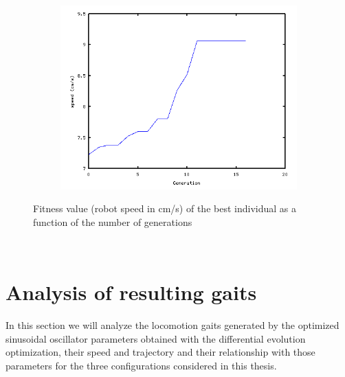 \begin{figure}[h]
\begin{subfigure}[b]{0.31\textwidth}
                \label{fig:results_fitness_plot_9}
        \end{subfigure}
        ~
        \begin{subfigure}[b]{0.315\textwidth}
         	   \centering
                \includegraphics[width=\textwidth]{images/results_7_fitness.png}
                \caption{\robotEleven}
                \label{fig:results_fitness_plot_11}
        \end{subfigure}        
        \caption{Fitness value (robot speed in cm/s) of the best individual as a function of the number of generations}
        \label{fig:results_fitness_plot}
\end{figure}
~\\



\section{Analysis of resulting gaits}
\label{results_gaits}

In this section we will analyze the locomotion gaits generated by the optimized sinusoidal oscillator parameters obtained with the differential evolution optimization, their speed and trajectory and their relationship with those parameters for the three configurations considered in this thesis.\\



\subsection{\robotSeven}

